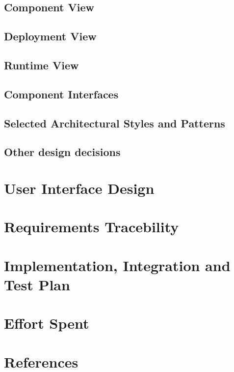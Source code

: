 \documentclass{article}
\begin{document}
	
	\subsection{Component View}
	\subsection{Deployment View}
	\subsection{Runtime View}
	\subsection{Component Interfaces}
	\subsection{Selected Architectural Styles and Patterns}
	\subsection{Other design decisions}

\section{User Interface Design}

\section{Requirements Tracebility}

\section{Implementation, Integration and Test Plan}

\section{Effort Spent}

\section{References}
\end{document}
